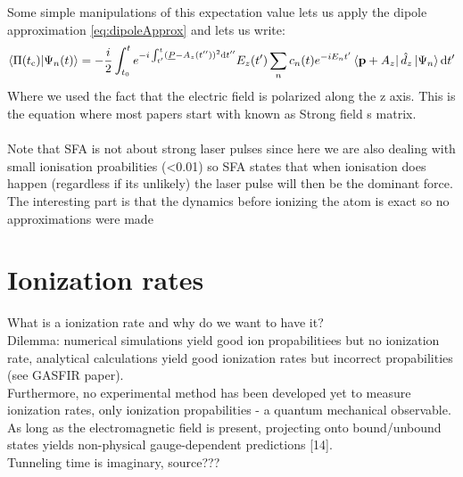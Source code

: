 Some simple manipulations of this expectation value lets us apply the dipole approximation \eqref{eq:dipoleApprox} and lets us write:
\begin{equation*}
    \braket{\Pi(t_{\mathrm{c}})|\Psi_n(t)} = -\frac{i}{2}\int_{t_0}^{t} e^{-i \int_{t'}^{t} (\underline{P} - A_z(t''))^2 \mathrm{d} t''}E_z(t')\sum_{n}c_n(t)e^{-iE_nt'}\bra{\mathbf{p}+A_z}\hat{d}_z\ket{\Psi_n} \mathrm{d} t'       \label{eq:smatrix}
\end{equation*}
Where we used the fact that the electric field is polarized along the z axis.
This is the equation where most papers start with \cite{Theory_NPS} known as Strong field s matrix.\\\\

Note that SFA is not about strong laser pulses since here we are also dealing with small ionisation proabilities (<0.01) so SFA states that when ionisation does happen (regardless if its unlikely) the laser pulse will then be the dominant force.\\
The interesting part is that the dynamics before ionizing the atom is exact so no approximations were made 







\section{Ionization rates}
What is a ionization rate and why do we want to have it?\\
Dilemma: numerical simulations yield good ion propabilitiees but no ionization rate, analytical calculations yield good ionization rates but incorrect propabilities (see GASFIR paper).\\
Furthermore, no experimental method has been developed yet to measure ionization rates, only ionization propabilities - a quantum mechanical observable.\\
As long as the electromagnetic
field is present, projecting onto bound/unbound states
yields non-physical gauge-dependent predictions [14].\\       %
Tunneling time is imaginary, source???\\











